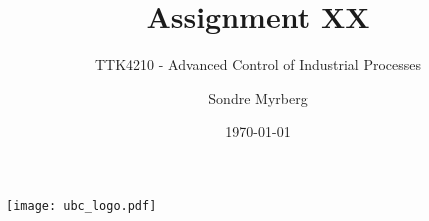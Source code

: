 \documentclass[a4paper]{scrartcl}
\title{Assignment XX}
\subtitle{TTK4210 - Advanced Control of Industrial Processes}
\author{Sondre Myrberg}
\date{\today}
\begin{document}
\hypersetup{pageanchor=false}
\begin{titlepage}
    \maketitle
    \vfill
    \vfill
    \vfill
    \vfill
    \vfill
    \texttt{[image: ubc\_logo.pdf]}
    \vfill
    \vfill
\end{titlepage}
\hypersetup{pageanchor=true}
\end{document}
